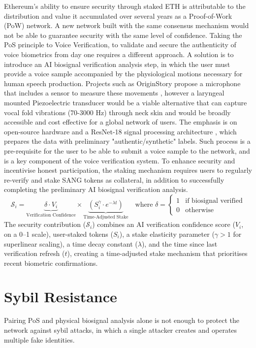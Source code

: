 \documentclass[11pt,a4paper]{article}
\begin{document}
Ethereum's ability to ensure security through staked ETH is attributable to the distribution and value it accumulated over several years as a Proof-of-Work (PoW) network.
A new network built with the same consensus mechanism would not be able to guarantee security with the same level of confidence.
Taking the PoS principle to Voice Verification, to validate and secure the authenticity of voice biometrics from day one requires a different approach.
A solution is to introduce an AI biosignal verification analysis step, in which the user must provide a voice sample accompanied by the physiological motions necessary for human speech production.
Projects such as OriginStory propose a microphone that includes a sensor to measure these movements \cite{ftc2024originstory}, however a laryngeal mounted Piezoelectric transducer would be a viable alternative that can capture vocal fold vibrations (70-3000 Hz) through neck skin and would be broadly accessible and cost effective for a global network of users.
The emphasis is on open-source hardware and a ResNet-18 signal processing architecture \cite{liu2025machine}, which prepares the data with preliminary "authentic/synthetic" labels.
Such process is a pre-requisite for the user to be able to submit a voice sample to the network, and is a key component of the voice verification system.
To enhance security and incentivise honest participation, the staking mechanism requires users to regularly re-verify and stake SANG tokens as collateral, in addition to successfully completing the preliminary AI biosignal verification analysis.
\begin{equation}
    \mathcal{S}_i = \underbrace{\delta \cdot V_i}_{\text{Verification Confidence}} \times \underbrace{\left(S_i^{\gamma} \cdot e^{-\lambda t}\right)}_{\text{Time-Adjusted Stake}} \quad \text{where } \delta = \begin{cases} 
    1 & \text{if biosignal verified} \\
    0 & \text{otherwise}
    \end{cases}
    \end{equation}
    The security contribution ($\mathcal{S}_i$) combines an AI verification confidence score ($V_i$, on a 0--1 scale), user-staked tokens ($S_i$), a stake elasticity parameter ($\gamma > 1$ for superlinear scaling), a time decay constant ($\lambda$), and the time since last verification refresh ($t$), creating a time-adjusted stake mechanism that prioritises recent biometric confirmations.
\section{Sybil Resistance}
\label{sec:methodology}
Pairing PoS and physical biosignal analysis alone is not enough to protect the network against sybil attacks, in which a single attacker creates and operates multiple fake identities.
\end{document}
